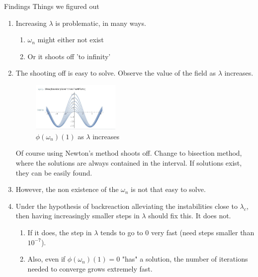 \begin{frame}[allowframebreaks]{Findings}
	Things we figured out
	\begin{enumerate}
		\item Increasing $\lambda$ is problematic, in many ways. 
			\begin{enumerate}
				\item $\omega_n$ might either not exist
				\item Or it shoots off 'to infinity'
			\end{enumerate}
		\item The shooting off is easy to solve.  Observe the value of the field as $\lambda$ increases. 
			\begin{figure}[h]
				\centering
				\includegraphics[width=0.4\textwidth]{figures/boundary-conditions.jpeg}
				\caption{$\phi(\omega_n)(1)$ as $\lambda$ increases}
				\label{fig:figures-boundary-conditions-jpeg}
			\end{figure}
			Of course using Newton's method shoots off. Change to bisection method, where the solutions are always contained in the interval. If solutions exist, they can be easily found.
		\item However, the non existence of the $\omega_n$ is not that easy to solve.
		\item Under the hypothesis of backreaction alleviating the instabilities close to $\lambda_c$, then having increasingly smaller steps in $\lambda$ should fix this. It does not.
			\begin{enumerate}
				\item If it does, the step in $\lambda$ tends to go to 0 very fast (need steps smaller than $10^{-7}$).
				\item Also, even if $\phi(\omega_n)(1)=0$ "has" a solution, the number of iterations needed to converge grows extremely fast.


\end{enumerate}
\end{enumerate}
\end{frame}
